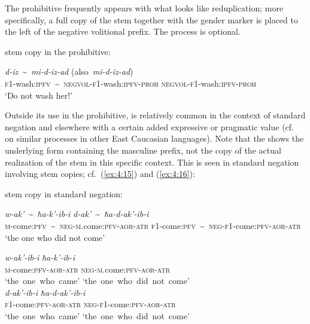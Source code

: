 \documentclass[output=paper]{langsci/langscibook}
\begin{document}
The prohibitive frequently appears with what looks like
reduplication; more specifically, a full copy of the stem together with
the gender marker is placed to the left of the negative volitional prefix.
The process is optional.

\ea %
stem copy in the prohibitive:

\gll \emph{d-iz}~\textasciitilde{}~\emph{mi-d-iz-ad} (also~\emph{mi-d-iz-ad})\\
\textsc{f1}-wash:\textsc{ipfv}~\textasciitilde{}~\textsc{negvol}-\textsc{f1}-wash:\textsc{ipfv}-\textsc{proh} \phantom{(also~}\textsc{negvol}-\textsc{f1}-wash:\textsc{ipfv}-\textsc{proh} \\
\glt `Do not wash her!'
\z

Outside its use in the prohibitive,  is relatively common in
the context of standard negation and elsewhere with a certain added
expressive or pragmatic value (cf.\ \citealt{maisak2012} on similar processes in
other East Caucasian languages). Note that the  shows the
underlying form containing the masculine prefix, not the copy of the
actual realization of the stem in this specific context. This is seen in
standard negation involving stem copies; cf.\ (\ref{ex:4:15}) and (\ref{ex:4:16}):

\pagebreak

\ea \label{ex:4:15} %
stem copy in standard negation:

\gll \emph{w-ak'~\textasciitilde{}~ħa-k'-ib-i} \emph{d-ak'}~\textasciitilde{}~\emph{ħa-d-ak'-ib-i}\\
\textsc{m}-come:\textsc{pfv}~\textasciitilde{}~\textsc{neg}-\textsc{m}.come:\textsc{pfv}-\textsc{aor}-\textsc{atr} \textsc{f1}-come:\textsc{pfv}~\textasciitilde{}~\textsc{neg}-\textsc{f1}-come:\textsc{pfv}-\textsc{aor}-\textsc{atr}\\
\glt `the one who did not come'

\ex \label{ex:4:16} %
\glll \emph{w-ak'-ib-i} \quad \emph{ħa-k'-ib-i}\\ 
\textsc{m}-come:\textsc{pfv}-\textsc{aor}-\textsc{atr} \quad \textsc{neg}-\textsc{m}.come:\textsc{pfv}-\textsc{aor}-\textsc{atr}\\
`the~one~who~came' \quad `the~one~who~did~not~come'\\

\glll \emph{d-ak'-ib-i} \quad \emph{ħa-d-ak'-ib-i}\\
\textsc{f1}-come:\textsc{pfv}-\textsc{aor}-\textsc{atr} \quad \textsc{neg}-\textsc{f1}-come:\textsc{pfv}-\textsc{aor}-\textsc{atr}\\
`the~one~who~came' \quad `the~one~who~did~not~come'\\
\z
\end{document}
